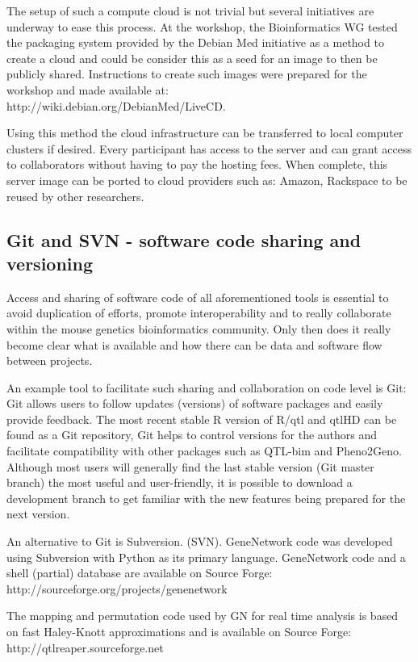 The setup of such a compute cloud is not trivial but several initiatives are underway to ease 
this process. At the workshop, the Bioinformatics WG tested the packaging system provided by 
the Debian Med initiative as a method to create a cloud and could be consider this as a seed 
for an image to then be publicly shared. Instructions to create such images were prepared for 
the workshop and made available at:\\
 http://wiki.debian.org/DebianMed/LiveCD. 
 
Using this method the cloud infrastructure can be transferred to local computer clusters 
if desired. Every participant has access to the server and can grant access to collaborators 
without having to pay the hosting fees. When complete, this server image can be ported to 
cloud providers such as: Amazon, Rackspace to be reused by other researchers.

\subsection*{Git and SVN - software code sharing and versioning}

Access and sharing of software code of all aforementioned tools is essential to avoid 
duplication of efforts, promote interoperability and to really collaborate within the mouse 
genetics bioinformatics community. Only then does it really become clear what is available 
and how there can be data and software flow between projects.

An example tool to facilitate such sharing and collaboration on code level is Git: Git 
allows users to follow updates (versions) of software packages and easily provide feedback. 
The most recent stable R version of R/qtl and qtlHD can be found as a Git repository, Git 
helps to control versions for the authors and facilitate compatibility with other packages 
such as QTL-bim and Pheno2Geno. Although most users will generally find the last stable version 
(Git master branch) the most useful and user-friendly, it is possible to download a 
development branch to get familiar with the new features being prepared for the next version.

An alternative to Git is Subversion. (SVN). GeneNetwork code was developed using Subversion with 
Python as its primary language. GeneNetwork code and a shell (partial) database are available on 
Source Forge:\\
http://sourceforge.org/projects/genenetwork

The mapping and permutation code used by GN for real time analysis is based on fast 
Haley-Knott approximations and is available on Source Forge:\\
http://qtlreaper.sourceforge.net

